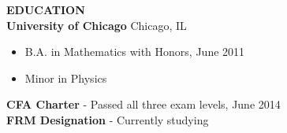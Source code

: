 \documentclass{article}
\begin{document}

\begin{flushleft}

\textbf{EDUCATION}\\
\hspace{20pt}
\textbf{University of Chicago} Chicago, IL
\begin{itemize}[leftmargin=50pt,itemsep=-1pt]
\item B.A. in Mathematics with Honors, June 2011
\item Minor in Physics
\end{itemize}
\hspace{20pt}
\textbf{CFA Charter} - Passed all three exam levels, June 2014\\
\vspace{6pt}
\hspace{20pt}
\textbf{FRM Designation} - Currently studying


\end{flushleft}
\end{document}

